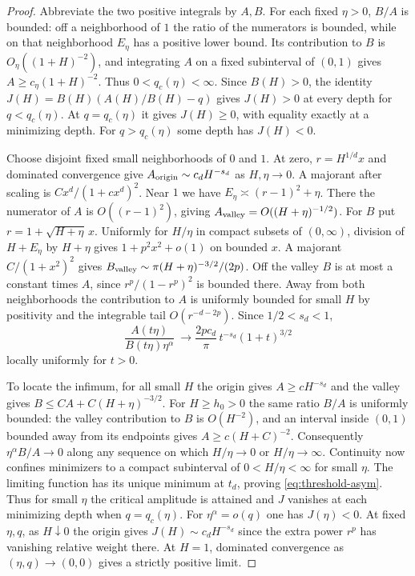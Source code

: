 \begin{proof}
Abbreviate the two positive integrals by $A,B$. For each fixed
$\eta>0$, $B/A$ is bounded: off a neighborhood of $1$ the ratio of
the numerators is bounded, while on that neighborhood $E_\eta$ has a
positive lower bound. Its contribution to $B$ is $O_\eta((1+H)^{-2})$,
and integrating $A$ on a fixed subinterval of $(0,1)$ gives
$A\ge c_\eta(1+H)^{-2}$. Thus $0<q_c(\eta)<\infty$.
Since $B(H)>0$, the identity $J(H)=B(H)(A(H)/B(H)-q)$ gives
$J(H)>0$ at every depth for $q<q_c(\eta)$. At $q=q_c(\eta)$ it gives
$J(H)\ge0$, with equality exactly at a minimizing depth. For $q>q_c(\eta)$
some depth has $J(H)<0$.

Choose disjoint fixed small neighborhoods of $0$ and $1$. At zero,
$r=H^{1/d}x$ and dominated convergence give
$A_{\rm origin}\sim c_d H^{-s_d}$ as $H,\eta\to0$. A majorant after
scaling is $C x^d/(1+c x^d)^2$. Near $1$ we have
$E_\eta\asymp (r-1)^2+\eta$. There the numerator of $A$ is
$O((r-1)^2)$, giving $A_{\rm valley}=O((H+\eta)^{-1/2})$.
For $B$ put $r=1+\sqrt{H+\eta}\,x$. Uniformly for $H/\eta$ in compact
subsets of $(0,\infty)$, division of $H+E_\eta$ by $H+\eta$
gives $1+p^2 x^2+o(1)$ on bounded $x$. A majorant $C/(1+x^2)^2$
gives $B_{\rm valley}\sim \pi( H+\eta)^{-3/2}/(2p)$.
Off the valley $B$ is at most a constant times $A$, since
$r^p/(1-r^p)^2$ is bounded there. Away from both neighborhoods the
contribution to $A$ is uniformly bounded for small $H$ by positivity
and the integrable tail $O(r^{-d-2p})$. Since $1/2<s_d<1$,
\[
 \frac{A(t\eta)}{B(t\eta)\eta^\alpha}\ \longrightarrow \frac{2p c_d}{\pi}\,t^{-s_d}(1+t)^{3/2}
\]
locally uniformly for $t>0$.

To locate the infimum, for all small $H$ the origin gives
$A\ge c H^{-s_d}$ and the valley gives $B\le C A+C(H+\eta)^{-3/2}$.
For $H\ge h_0>0$ the same ratio $B/A$ is uniformly bounded: the
valley contribution to $B$ is $O(H^{-2})$, and an interval inside
$(0,1)$ bounded away from its endpoints gives $A\ge c(H+C)^{-2}$.
Consequently $\eta^\alpha B/A\to0$ along any sequence on which
$H/\eta\to0$ or $H/\eta\to\infty$. Continuity now confines minimizers
to a compact subinterval of $0<H/\eta<\infty$ for small $\eta$.
The limiting function has its unique minimum at $t_d$, proving
\eqref{eq:threshold-asym}. Thus for small $\eta$ the critical amplitude
is attained and $J$ vanishes at each minimizing depth when $q=q_c(\eta)$.
For $\eta^\alpha=o(q)$ one has $J(\eta)<0$.
At fixed $\eta,q$, as $H\downarrow0$ the origin gives
$J(H)\sim c_d H^{-s_d}$ since the extra power $r^p$ has vanishing
relative weight there. At $H=1$, dominated convergence as
$(\eta,q)\to(0,0)$ gives a strictly positive limit.


\end{proof}
